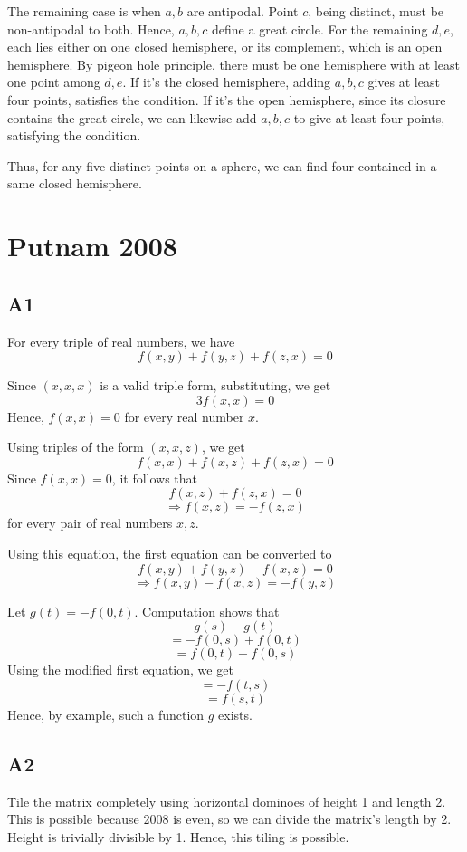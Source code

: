 \documentclass{book}
\begin{document}
The remaining case is when $a, b$ are antipodal. Point $c$, being distinct, must be non-antipodal to both. Hence, $a, b, c$ define a great circle. For the remaining $d, e$, each lies either on one closed hemisphere, or its complement, which is an open hemisphere. By pigeon hole principle, there must be one hemisphere with at least one point among $d, e$. If it's the closed hemisphere, adding $a, b, c$ gives at least four points, satisfies the condition. If it's the open hemisphere, since its closure contains the great circle, we can likewise add $a, b, c$ to give at least four points, satisfying the condition.

Thus, for any five distinct points on a sphere, we can find four contained in a same closed hemisphere.

\chapter{Putnam 2008}

\section*{A1}
For every triple of real numbers, we have
$$f(x, y) + f(y, z) + f(z, x) = 0$$

Since $(x, x, x)$ is a valid triple form, substituting, we get
$$3f(x, x) = 0$$
Hence, $f(x, x) = 0$ for every real number $x$.

Using triples of the form $(x, x, z)$, we get
$$f(x, x) + f(x, z) + f(z, x) = 0$$
Since $f(x, x) = 0$, it follows that
$$f(x, z) + f(z, x) = 0$$
$$\Rightarrow f(x, z) = -f(z, x)$$
for every pair of real numbers $x, z$.

Using this equation, the first equation can be converted to
$$f(x, y) + f(y, z) - f(x, z) = 0$$
$$\Rightarrow f(x, y) - f(x, z) = -f(y, z)$$

Let $g(t) = -f(0, t)$. Computation shows that
$$g(s) - g(t)$$
$$= -f(0, s) + f(0, t)$$
$$= f(0, t) - f(0, s)$$
Using the modified first equation, we get
$$= -f(t, s)$$
$$= f(s, t)$$
Hence, by example, such a function $g$ exists.

\section*{A2}
Tile the matrix completely using horizontal dominoes of height 1 and length 2. This is possible because 2008 is even, so we can divide the matrix's length by 2. Height is trivially divisible by 1. Hence, this tiling is possible.
\end{document}
